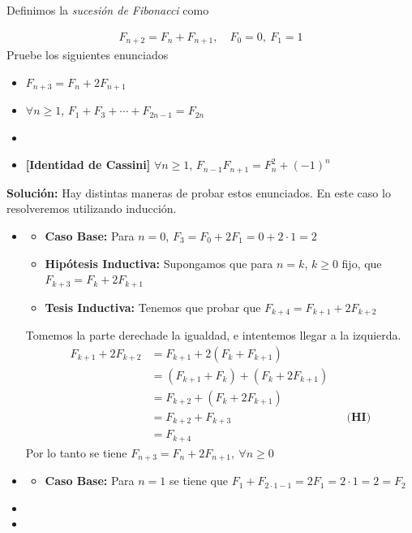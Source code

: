 \documentclass[12pt]{book}
\begin{document}
\begin{prob}{}{}
    Definimos la \emph{sucesión de Fibonacci} como 

    \begin{align*}
        F_{n+2}=F_n+F_{n+1}, \quad F_0=0, \ F_1=1
    \end{align*}
    Pruebe los siguientes enunciados 

    \begin{itemize}
        \item[\textbf{a)}] $F_{n+3}=F_n+2F_{n+1}$ 
        \item[\textbf{b)}] $\forall n \geq 1$, $F_1 +F_3 + \cdots + F_{2n-1}=F_{2n}$
        \item[\textbf{c)}] 
        \item[\textbf{d)}] \textbf{[Identidad de Cassini]} $\forall n \geq 1$, $F_{n-1}F_{n+1}=F_n^2+(-1)^n$
    \end{itemize}
\end{prob}
\textbf{Solución:}
Hay distintas maneras de probar estos enunciados. En este caso lo resolveremos utilizando inducción.
\begin{itemize}
   \item[\textbf{a)}] 

   \begin{itemize}
       \item \textbf{Caso Base:} Para $n=0$, $F_3=F_0+2F_1=0+2\cdot1=2$

       \item \textbf{Hipótesis Inductiva:}  Supongamos que para $n=k$, $k\geq 0$ fijo, que $F_{k+3}=F_k+2F_{k+1}$ 

       \item \textbf{Tesis Inductiva:} Tenemos que probar que $F_{k+4}=F_{k+1}+2F_{k+2}$
   \end{itemize}
Tomemos la parte derechade la igualdad, e intentemos llegar a la izquierda. 
   \begin{align*}
       F_{k+1}+2F_{k+2}&=F_{k+1}+2(F_{k}+F_{k+1}) \\
       &=(F_{k+1}+F_k)+(F_k+2F_{k+1}) \\
       &=F_{k+2}+(F_{k}+2F_{k+1}) \\
       &=F_{k+2}+F_{k+3} && \textbf{(HI)} \\
       &=F_{k+4}
   \end{align*}
   Por lo tanto se tiene $F_{n+3}=F_n+2F_{n+1}, \ \forall n\geq 0$
   \item[\textbf{b)}]  

   \begin{itemize}
       \item \textbf{Caso Base:} Para $n=1$ se tiene que $F_1+F_{2\cdot 1-1}=2F_1=2\cdot 1=2=F_2 $
   \end{itemize}

   
   \item[\textbf{c)}]
   \item[\textbf{d)}]
\end{itemize}
\end{document}
